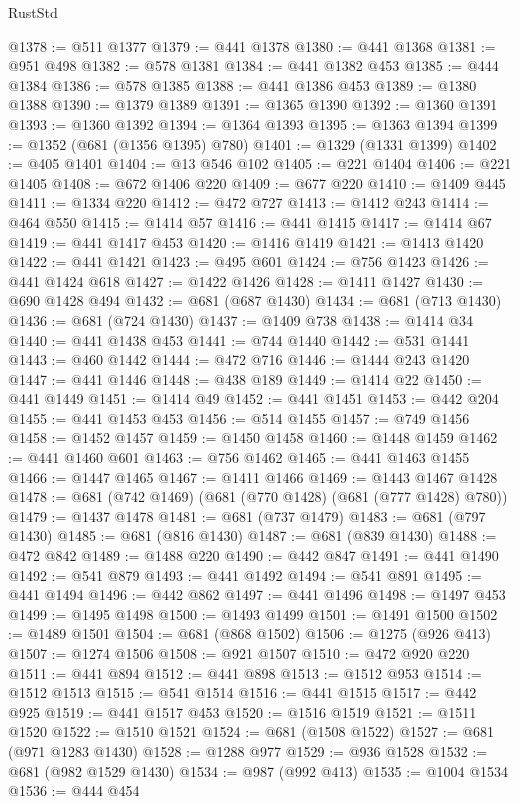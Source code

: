 \begin{lexlean}{RustStd}
\begin{coremodule}
@1378 := @511 @1377
@1379 := @441 @1378
@1380 := @441 @1368
@1381 := @951 @498
@1382 := @578 @1381
@1384 := @441 @1382 @453
@1385 := @444 @1384
@1386 := @578 @1385
@1388 := @441 @1386 @453
@1389 := @1380 @1388
@1390 := @1379 @1389
@1391 := @1365 @1390
@1392 := @1360 @1391
@1393 := @1360 @1392
@1394 := @1364 @1393
@1395 := @1363 @1394
@1399 := @1352 (@681 (@1356 @1395) @780)
@1401 := @1329 (@1331 @1399)
@1402 := @405 @1401
@1404 := @13 @546 @102
@1405 := @221 @1404
@1406 := @221 @1405
@1408 := @672 @1406 @220
@1409 := @677 @220
@1410 := @1409 @445
@1411 := @1334 @220
@1412 := @472 @727
@1413 := @1412 @243
@1414 := @464 @550
@1415 := @1414 @57
@1416 := @441 @1415
@1417 := @1414 @67
@1419 := @441 @1417 @453
@1420 := @1416 @1419
@1421 := @1413 @1420
@1422 := @441 @1421
@1423 := @495 @601
@1424 := @756 @1423
@1426 := @441 @1424 @618
@1427 := @1422 @1426
@1428 := @1411 @1427
@1430 := @690 @1428 @494
@1432 := @681 (@687 @1430)
@1434 := @681 (@713 @1430)
@1436 := @681 (@724 @1430)
@1437 := @1409 @738
@1438 := @1414 @34
@1440 := @441 @1438 @453
@1441 := @744 @1440
@1442 := @531 @1441
@1443 := @460 @1442
@1444 := @472 @716
@1446 := @1444 @243 @1420
@1447 := @441 @1446
@1448 := @438 @189
@1449 := @1414 @22
@1450 := @441 @1449
@1451 := @1414 @49
@1452 := @441 @1451
@1453 := @442 @204
@1455 := @441 @1453 @453
@1456 := @514 @1455
@1457 := @749 @1456
@1458 := @1452 @1457
@1459 := @1450 @1458
@1460 := @1448 @1459
@1462 := @441 @1460 @601
@1463 := @756 @1462
@1465 := @441 @1463 @1455
@1466 := @1447 @1465
@1467 := @1411 @1466
@1469 := @1443 @1467 @1428
@1478 := @681 (@742 @1469) (@681 (@770 @1428) (@681 (@777 @1428) @780))
@1479 := @1437 @1478
@1481 := @681 (@737 @1479)
@1483 := @681 (@797 @1430)
@1485 := @681 (@816 @1430)
@1487 := @681 (@839 @1430)
@1488 := @472 @842
@1489 := @1488 @220
@1490 := @442 @847
@1491 := @441 @1490
@1492 := @541 @879
@1493 := @441 @1492
@1494 := @541 @891
@1495 := @441 @1494
@1496 := @442 @862
@1497 := @441 @1496
@1498 := @1497 @453
@1499 := @1495 @1498
@1500 := @1493 @1499
@1501 := @1491 @1500
@1502 := @1489 @1501
@1504 := @681 (@868 @1502)
@1506 := @1275 (@926 @413)
@1507 := @1274 @1506
@1508 := @921 @1507
@1510 := @472 @920 @220
@1511 := @441 @894
@1512 := @441 @898
@1513 := @1512 @953
@1514 := @1512 @1513
@1515 := @541 @1514
@1516 := @441 @1515
@1517 := @442 @925
@1519 := @441 @1517 @453
@1520 := @1516 @1519
@1521 := @1511 @1520
@1522 := @1510 @1521
@1524 := @681 (@1508 @1522)
@1527 := @681 (@971 @1283 @1430)
@1528 := @1288 @977
@1529 := @936 @1528
@1532 := @681 (@982 @1529 @1430)
@1534 := @987 (@992 @413)
@1535 := @1004 @1534
@1536 := @444 @454

\end{coremodule}
\end{lexlean}
